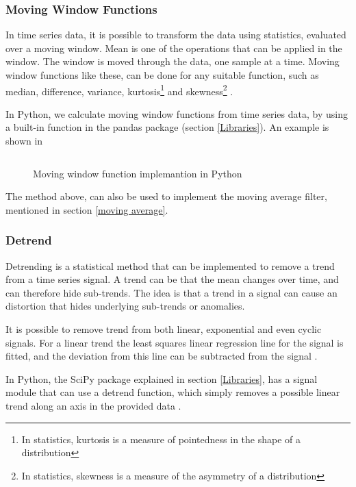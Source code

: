 \documentclass[english, a4paper]{report}
\begin{document}
{{{            \subsubsection{Moving Window Functions}\label{movingWindow}
            {
                In time series data, it is possible to transform the data using statistics, evaluated over a moving window. 
                Mean is one of the operations that can be applied in the window. The window is moved through the data, one sample at a time. Moving window functions like these, can be done for any suitable function, such as median, difference, variance, kurtosis\footnote{In statistics, kurtosis is a measure of pointedness in the shape of a distribution} and skewness\footnote{In statistics, skewness is a measure of the asymmetry of a distribution} \cite{pythonDA}.
                \par 
                In Python, we calculate moving window functions from time series data, by using a built-in function in the pandas package (section \ref{Libraries}). An example is shown in  
                
                \begin{figure}[H]
                    \centering {} \inputminted{python}{thesis/Code/Rolling.py}
                    \caption{Moving window function implemantion in Python}
                    \label{fig:RollingImpl}
                \end{figure}
                
                The method above, can also be used to implement the moving average filter, mentioned in section \ref{moving average}.
            }
            
            \subsubsection{Detrend}\label{detrend}
            {
                Detrending is a statistical method that can be implemented to remove a trend from a time series signal. 
                A trend can be that the mean changes over time, and can therefore hide sub-trends. The idea is that a trend in a signal can cause an distortion that hides underlying sub-trends or anomalies.
                \par 
                It is possible to remove trend from both linear, exponential and even cyclic signals. For a linear trend the least squares linear regression line for the signal is fitted, and the deviation from this line can be subtracted from the signal \cite{detrend-web}.
                \par
                In Python, the SciPy package explained in section \ref{Libraries}, has a signal module that can use a detrend function, which simply removes a possible linear trend along an axis in the provided data \cite{pythonDA}.
            }
        }
        
}}
\end{document}
